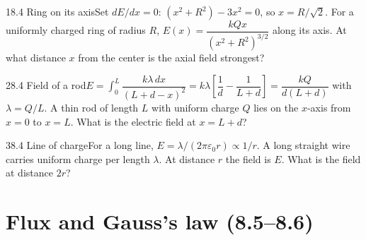 \documentclass[11pt]{article}
\begin{document}
\begin{q}{1}{8.4 Ring on its axis}{Set $dE/dx = 0$: $(x^2 + R^2) - 3x^2 = 0$, so $x = R/\sqrt2$.}
For a uniformly charged ring of radius $R$, $E(x) = \dfrac{kQx}{(x^2 + R^2)^{3/2}}$ along its axis. At what distance $x$ from the center is the axial field strongest?
\end{q}
\begin{q}{2}{8.4 Field of a rod}{$E = \int_0^L \dfrac{k\lambda\,dx}{(L + d - x)^2} = k\lambda\left[\dfrac1d - \dfrac{1}{L + d}\right] = \dfrac{kQ}{d(L + d)}$ with $\lambda = Q/L$.}
A thin rod of length $L$ with uniform charge $Q$ lies on the $x$-axis from $x = 0$ to $x = L$. What is the electric field at $x = L + d$?
\end{q}
\begin{q}{3}{8.4 Line of charge}{For a long line, $E = \lambda/(2\pi\varepsilon_0 r) \propto 1/r$.}
A long straight wire carries uniform charge per length $\lambda$. At distance $r$ the field is $E$. What is the field at distance $2r$?
\end{q}

\section{Flux and Gauss's law (8.5--8.6)}
\end{document}
